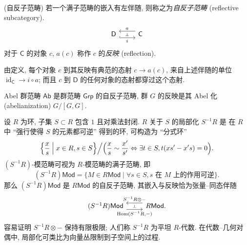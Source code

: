 \begin{definition}
	[label={reflective-subcategory}]
	{(自反子范畴)}
	若一个满子范畴的嵌入有左伴随, 则称之为\emph{自反子范畴} (reflective subcategory).
	\[\begin{tikzcd}[ampersand replacement=\&]
		{\mathsf D} \& {\mathsf C}
		\arrow[""{name=0, anchor=center, inner sep=0}, "i"', shift right=2, hook, from=1-1, to=1-2]
		\arrow[""{name=1, anchor=center, inner sep=0}, "a"', shift right=2, from=1-2, to=1-1]
		\arrow["\dashv"{anchor=center, rotate=-90}, draw=none, from=1, to=0]
	\end{tikzcd}\]
	对于 $\mathsf C$ 的对象 $c$, $a(c)$ 称作 $c$ 的\emph{反映} (reflection).
\end{definition}

由定义, 每个对象 $c$ 到其反映有典范的态射 $c \to a(c)$, 来自上述伴随的单位 $\operatorname{id}_{\mathsf C}\to i\circ a$;
而且 $c$ 到 $\mathsf D$ 的任何对象的态射都穿过这个态射.

\begin{example}
	{}
	Abel 群范畴 $\mathsf {Ab}$ 是群范畴 $\mathsf {Grp}$ 的自反子范畴, 群 $G$ 的反映是其 Abel 化 (abelianization) $G/[G,G]$.
\end{example}

\begin{example}
	{}
	设 $R$ 为环, 子集 $S\subset R$ 包含 $1$ 且对乘法封闭. $R$ 关于 $S$ 的局部化 $S^{-1}R$ 是
	在 $R$ 中 ``强行使得 $S$ 的元素都可逆'' 得到的环,
	可构造为 ``分式环'' $$
	\Big\{\frac{x}{s} \Bigm| x\in R, s\in S\Big\}\Big/
	\Big(
	\frac{x}{s}\sim\frac{x'}{s'}\Leftrightarrow\exists
	t\in S, t(xs'-x's)=0
	\Big).$$
	$(S^{-1}R)$-模范畴可视为 $R$-模范畴的满子范畴,
	即
	\[
	(S^{-1}R)\mathsf {Mod}=\{ M\in R\mathsf {Mod} \mid \forall s\in S,
	\text{$s$ 在 $M$ 上的作用可逆} \}.
	\]
	那么 $(S^{-1}R)\mathsf {Mod}$ 是 $R\mathsf {Mod}$ 的自反子范畴,
	其嵌入与反映恰为张量--同态伴随
	\[\begin{tikzcd}[ampersand replacement=\&]
		{(S^{-1}R)\mathsf {Mod}} \& {R\mathsf {Mod}.}
		\arrow[""{name=0, anchor=center, inner sep=0}, "{\operatorname{Hom}(S^{-1}R,-)}"', shift right=2, from=1-1, to=1-2]
		\arrow[""{name=1, anchor=center, inner sep=0}, "{S^{-1}R\otimes -}"', shift right=2, from=1-2, to=1-1]
		\arrow["\dashv"{anchor=center, rotate=-90}, draw=none, from=1, to=0]
	\end{tikzcd}\]
	容易证明 $S^{-1}R\otimes -$ 保持有限极限; 人们称 $S^{-1}R$ 为平坦 $R$-代数.
	在代数--几何对偶中, 局部化可类比为向量丛限制到子空间上的过程.
\end{example}

